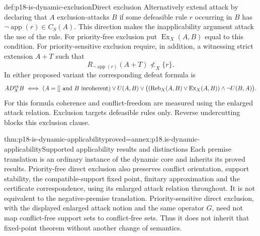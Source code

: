 \begin{hbdefinition}{def:p18-is-dynamic-exclusion}{Direct exclusion}
Alternatively extend attack by declaring that \(A\) exclusion-attacks
\(B\) if some defeasible rule \(r\) occurring in \(B\) has
\(\neg\operatorname{app}(r)\in C_S(A)\).
This direction makes the inapplicability argument attack the use
of the rule.
For priority-free exclusion put
\(\operatorname{Ex}_X(A,B)\) equal to this condition.
For priority-sensitive exclusion require, in addition, a witnessing
strict extension \(A+T\) such that
\[
 R_{\neg\operatorname{app}(r)}(A+T)\not<_X\{r\}.
\]
In either proposed variant the corresponding defeat formula is
\[
 A D_X^{\rm ex}B\ \Longleftrightarrow\
 (A=[]\text{ and }B\text{ incoherent})\lor U(A,B)
 \lor\bigl((\operatorname{Reb}_X(A,B)\lor\operatorname{Ex}_X(A,B))
                         \land\neg U(B,A)\bigr).
\]
For this formula coherence and conflict-freedom are measured using
the enlarged attack relation. Exclusion targets defeasible rules
only. Reverse undercutting blocks this exclusion clause.
\end{hbdefinition}

\begin{hbtheorem}{thm:p18-is-dynamic-applicability}{proved=annex:p18.is-dynamic-applicability}{Supported applicability results and distinctions}
Each premise translation is an ordinary instance of the dynamic
core and inherits its proved results.
Priority-free direct exclusion also preserves conflict orientation,
support stability, the compatible-support fixed point, finitary
approximation and the certificate correspondence, using its enlarged
attack relation throughout.
It is not equivalent to the negative-premise translation.
Priority-sensitive direct exclusion, with the displayed enlarged
attack notion and the same operator \(G\), need not map
conflict-free support sets to conflict-free sets. Thus it does not
inherit that fixed-point theorem without another change of semantics.
\end{hbtheorem}

